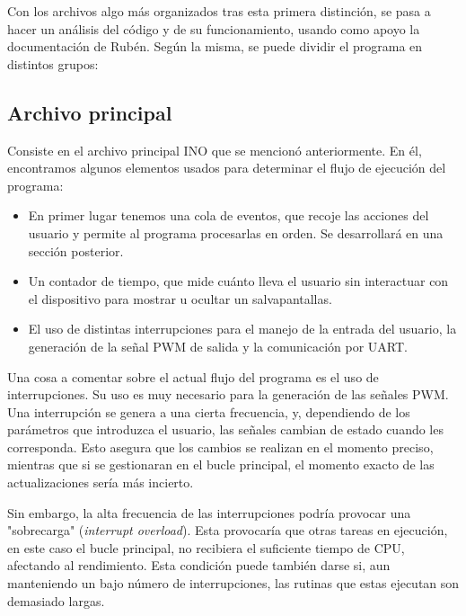 Con los archivos algo más organizados tras esta primera distinción, se pasa a hacer un análisis del código y de su funcionamiento, usando como apoyo la documentación de Rubén. Según la misma, se puede dividir el programa en distintos grupos:

\subsection{Archivo principal}

Consiste en el archivo principal INO que se mencionó anteriormente. En él, encontramos algunos elementos usados para determinar el flujo de ejecución del programa:

\begin{itemize}
    \item En primer lugar tenemos una cola de eventos, que recoje las acciones del usuario y permite al programa procesarlas en orden. Se desarrollará en una sección posterior.
    \item Un contador de tiempo, que mide cuánto lleva el usuario sin interactuar con el dispositivo para mostrar u ocultar un salvapantallas.
    \item El uso de distintas interrupciones para el manejo de la entrada del usuario, la generación de la señal PWM de salida y la comunicación por UART. %
\end{itemize}

Una cosa a comentar sobre el actual flujo del programa es el uso de interrupciones. Su uso es muy necesario para la generación de las señales PWM. Una interrupción se genera a una cierta frecuencia, y, dependiendo de los parámetros que introduzca el usuario, las señales cambian de estado cuando les corresponda. Esto asegura que los cambios se realizan en el momento preciso, mientras que si se gestionaran en el bucle principal, el momento exacto de las actualizaciones sería más incierto.

Sin embargo, la alta frecuencia de las interrupciones podría provocar una "sobrecarga" (\textit{interrupt overload}). Esta provocaría que otras tareas en ejecución, en este caso el bucle principal, no recibiera el suficiente tiempo de CPU, afectando al rendimiento. Esta condición puede también darse si, aun manteniendo un bajo número de interrupciones, las rutinas que estas ejecutan son demasiado largas.


